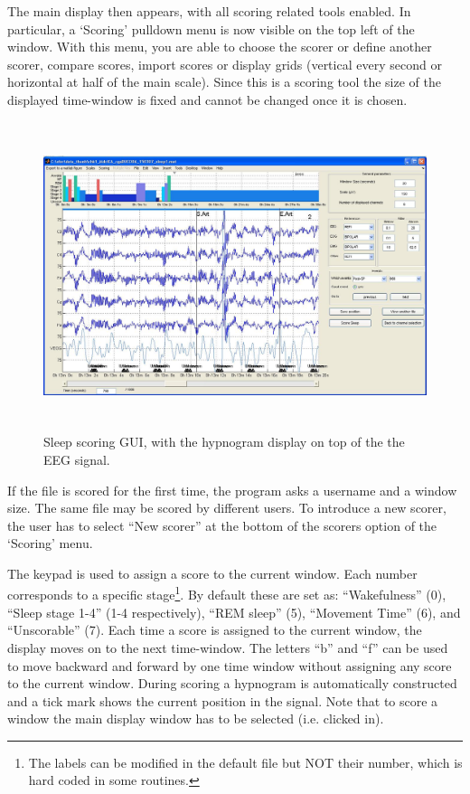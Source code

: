 \documentclass[a4paper,titlepage]{article}
\begin{document}
The main display then appears, with all scoring related tools enabled. In particular, a `Scoring' pulldown menu is now visible on the top left of the window. With this menu, you are able to choose the scorer or define another scorer, compare scores, import scores or display grids (vertical every second or horizontal at half of the main scale).
Since this is a scoring tool the size of the displayed time-window is fixed and cannot be changed once it is chosen. 


\begin{figure}[ht]
	\centering
		\includegraphics[width=15cm,height=9cm]{images/FIG11_dis_score.jpg}
	\caption{Sleep scoring GUI, with the hypnogram display on top of the the EEG signal.
	\label{fig:TB_dis_score}}
\end{figure}

If the file is scored for the first time, the program asks a username and a window size. The same file may be scored by different users. To introduce a new scorer, the user has to select ``New scorer'' at the bottom of the scorers option of the `Scoring' menu.

The keypad is used to assign a score to the current window. Each number corresponds to a specific stage\footnote{The labels can be modified in the default file but NOT their number, which is hard coded in some routines.}. By default these are set as: ``Wakefulness'' (0), ``Sleep stage 1-4'' (1-4 respectively), ``REM sleep'' (5), ``Movement Time'' (6), and ``Unscorable'' (7). Each time a score is assigned to the current window, the display moves on to the next time-window. The letters ``b'' and ``f'' can be used to move backward and forward by one time window without assigning any score to the current window. During scoring a hypnogram is automatically constructed and a tick mark shows the current position in the signal. Note that to score a window the main display window has to be selected (i.e. clicked in).
\end{document}
